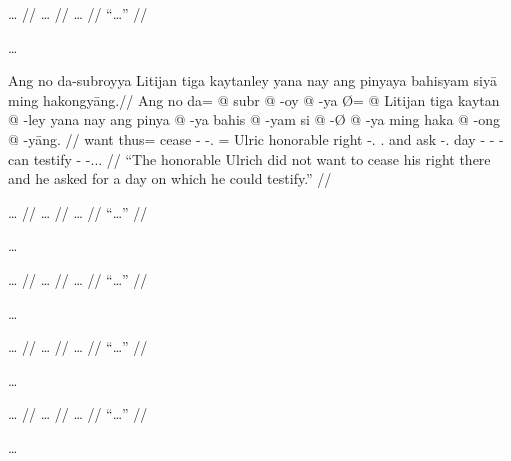 \documentclass[12pt,paper=a4]{scrartcl}
\begin{document}
\ex \begingl
	\glpreamble … //
	\gla … //
	\glb … //
	\glft \enquote{…} //
\endgl \xe

…


\ex \begingl
	\glpreamble Ang no da-subroyya Litijan tiga kaytanley yana nay 
		ang pinyaya bahisyam siyā ming hakongyāng.//
	\gla Ang no da= @ subr @ -oy @ -ya Ø= @ Litijan tiga kaytan @ -ley yana 
		nay ang pinya @ -ya bahis @ -yam si @ -Ø @ -ya ming haka @ -ong @ 
		-yāng. //
	\glb \AgtT{} want thus= cease -\Neg{} -\Tsg{}.\M{} \Top{}= Ulric 
		honorable right -\Parg{}.\Inan{} \Tsg{}.\Gen{} and \AgtT{} ask 
		-\Tsg{}.\M{} day -\Dat{} \Rel{} -\Dat{} -\Loc{} can testify 
		-\Irr{} -\Tsg{}.\M{}.\Aarg{}. //
	\glft \enquote{The honorable Ulrich did not want to cease his right 
		there and he asked for a day on which he could testify.} //
\endgl \xe


\ex \begingl
	\glpreamble … //
	\gla … //
	\glb … //
	\glft \enquote{…} //
\endgl \xe

…


\ex \begingl
	\glpreamble … //
	\gla … //
	\glb … //
	\glft \enquote{…} //
\endgl \xe

…


\ex \begingl
	\glpreamble … //
	\gla … //
	\glb … //
	\glft \enquote{…} //
\endgl \xe

…


\ex \begingl
	\glpreamble … //
	\gla … //
	\glb … //
	\glft \enquote{…} //
\endgl \xe

…

\end{document}
